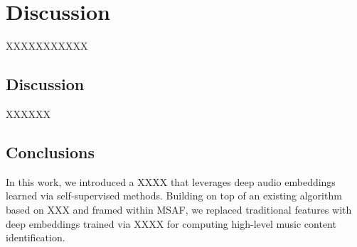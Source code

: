 \chapter{Discussion}

XXXXXXXXXXX

\section{Discussion}

XXXXXX

\section{Conclusions}

In this work, we introduced a XXXX that leverages deep audio embeddings learned via self-supervised methods. Building on top of an existing algorithm based on XXX and framed within MSAF, we replaced traditional features with deep embeddings trained via XXXX for computing high-level music content identification.


\newpage


